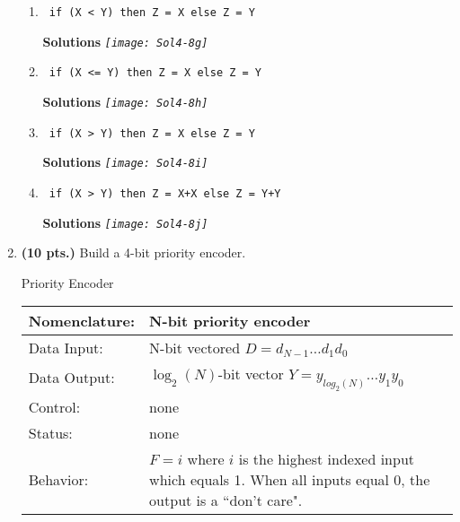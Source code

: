 \begin{enumerate}
\begin{enumerate}
\item \verb^ if (X < Y) then Z = X else Z = Y ^

\begin{onlysolution} \textbf{Solutions} \itshape{
\texttt{[image: Sol4-8g]}
} \end{onlysolution} 

\item \verb^ if (X <= Y) then Z = X else Z = Y ^

\begin{onlysolution} \textbf{Solutions} \itshape{
\texttt{[image: Sol4-8h]}
} \end{onlysolution} 

\item \verb^ if (X > Y) then Z = X else Z = Y ^

\begin{onlysolution} \textbf{Solutions} \itshape{
\texttt{[image: Sol4-8i]}
} \end{onlysolution} 

\item \verb^ if (X > Y) then Z = X+X else Z = Y+Y ^

\begin{onlysolution} \textbf{Solutions} \itshape{
\texttt{[image: Sol4-8j]}
} \end{onlysolution} 

\end{enumerate}

\item \textbf{ (10 pts.)} Build a 4-bit priority encoder.

\begin{buildingblock}{Priority Encoder}
\begin{tabular}{|l|p{3.5in}|} \hline
Nomenclature:  & N-bit priority encoder                \\ \hline
Data Input:    & N-bit vectored  $D=d_{N-1} \ldots d_1 d_0$  \\ \hline
Data Output:   & $\log_2(N)$-bit vector $Y=y_{log_2(N)} \ldots y_1 y_0$    \\ \hline
Control:       & none					\\ \hline
Status:        & none                                   \\ \hline
Behavior:      & $F = i$ where $i$ is the highest indexed input
			which equals 1.  When all inputs equal
			0, the output is a ``don't care".  \\ \hline
\end{tabular}
\label{page:prior}
\end{buildingblock}


\end{enumerate}
